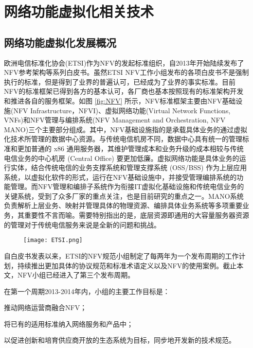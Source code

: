 \chapter{网络功能虚拟化相关技术}
\label{chap:relatedwork}

\section{网络功能虚拟化发展概况}
欧洲电信标准化协会(ETSI)作为NFV的发起标准组织，自2013年开始陆续发布了NFV参考架构等系列白皮书。虽然ETSI NFV工作小组发布的各项白皮书不是强制执行的标准，但是得到了业界的普遍认可，已经成为了业界的事实标准。目前NFV的标准框架已得到各方的基本认可，各厂商也基本按照现有的标准架构开发和推进各自的服务框架。如图 \ref{fig:NFV} 所示，NFV标准框架主要由NFV基础设施(NFV Infrastructure，NFVI)、虚拟网络功能(Virtual Network Functions, VNFs)和NFV管理与编排系统(NFV Management and Orchestration, NFV MANO)三个主要部分组成。其中，NFV基础设施指的是承载具体业务的通过虚拟化技术所管理的数据中心资源。与传统电信机房不同，数据中心具有统一的管理标准和更加普通的 x86 通用服务器，其维护管理成本和业务升级的成本相较与传统电信业务的中心机房 (Central Office) 要更加低廉。虚拟网络功能是具体业务的运行实体，结合传统电信的业务支撑系统和管理支撑系统 (OSS/BSS) 作为上层应用系统，以虚拟化软件的形式，运行在NFV基础设施中，并接受管理编排系统的功能管理。而NFV管理和编排子系统作为衔接IT虚拟化基础设施和传统电信业务的关键系统，受到了众多厂家的重点关注，也是目前研究的重点之一。MANO系统负责解析上层业务、映射并管理具体的物理资源、编排具体业务系统等多项重要业务，其重要性不言而喻。需要特别指出的是，底层资源即通用的大容量服务器资源的管理对于传统电信服务来说是全新的问题和挑战。

\begin{figure}[!htp]
	\centering
	\texttt{[image: ETSI.png]}
\end{figure}

自白皮书发表以来，ETSI的NFV规范小组制定了每两年为一个发布周期的工作计划，持续推出更加具体的协议规范和标准术语定义以及NFV的使用案例。截止本文，NFV小组已经进入了第三个发布周期。

在第一个周期2013-2014年内，小组的主要工作目标是：
\begin{enumerate*}[label=\itshape\alph*)\upshape]
	\item 推动网络运营商融合NFV；
	\item 将已有的适用标准纳入网络服务和产品中；
	\item 以促进创新和培育供应商开放的生态系统为目标，同步地开发新的技术规范。
\end{enumerate*}

